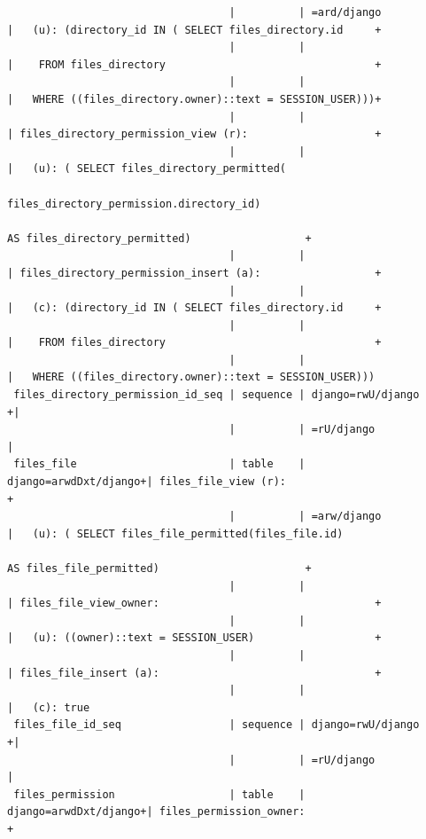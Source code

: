 \documentclass[12pt]{report}
\begin{document}
\begin{landscape}
{\begin{verbatim}
                                   |          | =ard/django           |   (u): (directory_id IN ( SELECT files_directory.id     +
                                   |          |                       |    FROM files_directory                                 +
                                   |          |                       |   WHERE ((files_directory.owner)::text = SESSION_USER)))+
                                   |          |                       | files_directory_permission_view (r):                    +
                                   |          |                       |   (u): ( SELECT files_directory_permitted(
                                                                                 files_directory_permission.directory_id)
                                                                                 AS files_directory_permitted)                  +
                                   |          |                       | files_directory_permission_insert (a):                  +
                                   |          |                       |   (c): (directory_id IN ( SELECT files_directory.id     +
                                   |          |                       |    FROM files_directory                                 +
                                   |          |                       |   WHERE ((files_directory.owner)::text = SESSION_USER)))
 files_directory_permission_id_seq | sequence | django=rwU/django    +|
                                   |          | =rU/django            |
 files_file                        | table    | django=arwdDxt/django+| files_file_view (r):                                    +
                                   |          | =arw/django           |   (u): ( SELECT files_file_permitted(files_file.id)
                                                                                 AS files_file_permitted)                       +
                                   |          |                       | files_file_view_owner:                                  +
                                   |          |                       |   (u): ((owner)::text = SESSION_USER)                   +
                                   |          |                       | files_file_insert (a):                                  +
                                   |          |                       |   (c): true
 files_file_id_seq                 | sequence | django=rwU/django    +|
                                   |          | =rU/django            |
 files_permission                  | table    | django=arwdDxt/django+| files_permission_owner:                                 +

\end{verbatim}}
\end{landscape}
\end{document}
